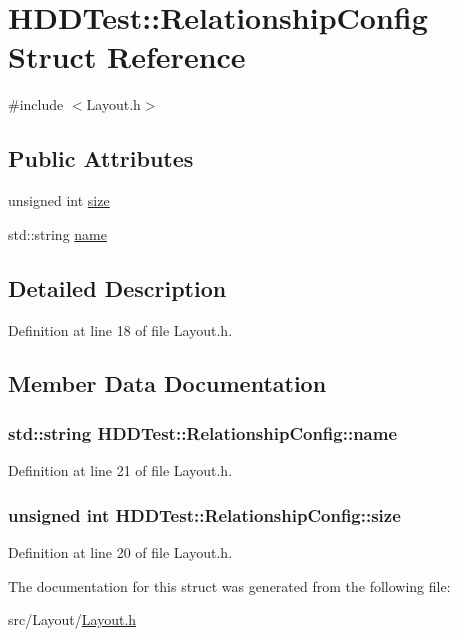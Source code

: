 \hypertarget{struct_h_d_d_test_1_1_relationship_config}{\section{H\-D\-D\-Test\-:\-:Relationship\-Config Struct Reference}
\label{struct_h_d_d_test_1_1_relationship_config}
}


{\ttfamily \#include $<$Layout.\-h$>$}

\subsection*{Public Attributes}
\begin{DoxyCompactItemize}
\item 
unsigned int \hyperlink{struct_h_d_d_test_1_1_relationship_config_aa85591a1ae2dce1683ea483f410d281d}{size}
\item 
std\-::string \hyperlink{struct_h_d_d_test_1_1_relationship_config_afd83c7f8b3b77c39814f43e1e86c56c8}{name}
\end{DoxyCompactItemize}


\subsection{Detailed Description}


Definition at line 18 of file Layout.\-h.



\subsection{Member Data Documentation}
\hypertarget{struct_h_d_d_test_1_1_relationship_config_afd83c7f8b3b77c39814f43e1e86c56c8}{
\subsubsection[{name}]{\setlength{\rightskip}{0pt plus 5cm}std\-::string H\-D\-D\-Test\-::\-Relationship\-Config\-::name}}\label{struct_h_d_d_test_1_1_relationship_config_afd83c7f8b3b77c39814f43e1e86c56c8}


Definition at line 21 of file Layout.\-h.

\hypertarget{struct_h_d_d_test_1_1_relationship_config_aa85591a1ae2dce1683ea483f410d281d}{
\subsubsection[{size}]{\setlength{\rightskip}{0pt plus 5cm}unsigned int H\-D\-D\-Test\-::\-Relationship\-Config\-::size}}\label{struct_h_d_d_test_1_1_relationship_config_aa85591a1ae2dce1683ea483f410d281d}


Definition at line 20 of file Layout.\-h.



The documentation for this struct was generated from the following file\-:\begin{DoxyCompactItemize}
\item 
src/\-Layout/\hyperlink{_layout_8h}{Layout.\-h}\end{DoxyCompactItemize}
